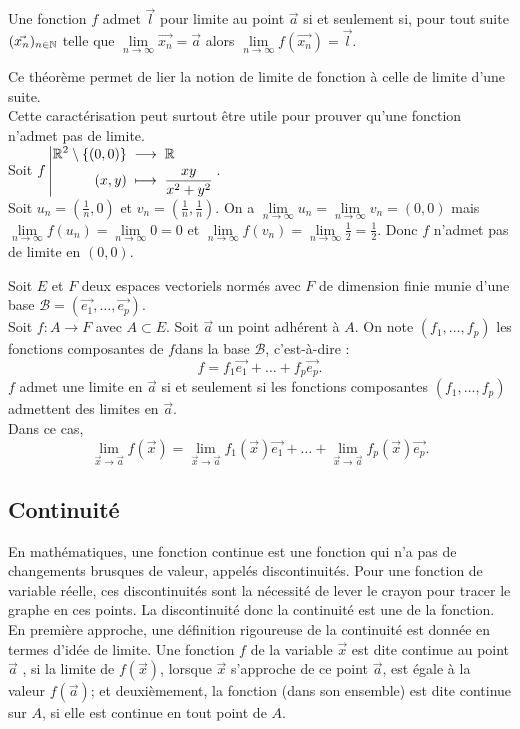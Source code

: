 \documentclass{book}
\begin{document}
\begin{Theoreme}
Une fonction $f$ admet $\vec{l}$ pour limite au point $\vec{a}$ si et seulement si, pour tout suite $(\vec{x_n})_{n\in\mathbb{N}}$  telle que $\lim\limits_{n\to\infty}\vec{x_n}=\vec{a}$ alors $\lim\limits_{n\to\infty}f(\vec{x_n})=\vec{l}$.
\end{Theoreme}
\begin{Remarque}
Ce théorème permet de lier la notion de limite de fonction à celle de limite d'une suite.\\
Cette caractérisation peut surtout être utile pour prouver qu'une fonction n'admet pas de limite. \\
Soit ${f}\left|\begin{aligned}{\mathbb{R}^2\setminus \{(0,0)\}}&\;\longrightarrow\;{\mathbb{R}}\\{(x,y)}&\;\longmapsto\;{\frac{x y }{x^2+y^2}}\end{aligned}\right. $.\\
Soit $u_n=(\frac 1 n,0)$ et $v_n=(\frac 1 n,\frac 1 n)$. 
On a $\lim\limits_{n\to\infty}u_n=\lim\limits_{n\to\infty}v_n=(0,0)$ mais $\lim\limits_{n\to\infty}f(u_n)=\lim\limits_{n\to\infty}0=0$ et $\lim\limits_{n\to\infty}f(v_n)=\lim\limits_{n\to\infty}\frac{1}{2}=\frac{1}{2}.$ Donc $f$ n'admet pas de limite en $(0,0)$.
\end{Remarque}
\begin{Proposition}
Soit $E$ et $F$ deux espaces vectoriels normés avec $F$ de dimension finie munie d'une base $\mathcal{B}=(\vec{e_1},\dots, \vec{e_p})$.\\
Soit $f:A\to F$ avec $A\subset E$. Soit $\vec{a}$ un point adhérent à $A$.
On note  $(f_1, \dots, f_p)$ les fonctions composantes de $f $dans la base
$\mathcal{B}$, c'est-à-dire : $$f=f_1\vec{e_1}+\dots + f_p\vec{e_p}.$$
$f$ admet une limite en $\vec{a}$ si et seulement si les fonctions composantes $(f_1, \dots, f_p)$ admettent des limites en $\vec{a}$.\\
Dans ce cas, $$\lim_{\vec{x}\to\vec{a} } f(\vec{x})= \lim_{\vec{x}\to\vec{a} } f_1(\vec{x})\vec{e_1}+\dots+\lim_{\vec{x}\to\vec{a} } f_p(\vec{x})\vec{e_p}.$$
\end{Proposition}
\subsection{Continuité}

En mathématiques, une fonction continue est une fonction qui n'a pas de changements brusques de valeur, appelés discontinuités. Pour une fonction de variable réelle, ces discontinuités sont la nécessité de lever le crayon pour tracer le graphe en ces points. La discontinuité donc la continuité est une  de la fonction.\\
En première approche, une définition rigoureuse de la continuité est donnée en termes d'idée de limite. Une fonction $f$ de la variable $\vec{x}$ est dite continue au point $\vec{a}$ , si la limite de $f(\vec{x})$, lorsque $\vec{x}$ s'approche de ce point $\vec{a}$, est égale à la valeur $f(\vec{a})$; et deuxièmement, la fonction (dans son ensemble) est dite continue sur $A$, si elle est continue en tout point de $A$.
\end{document}
